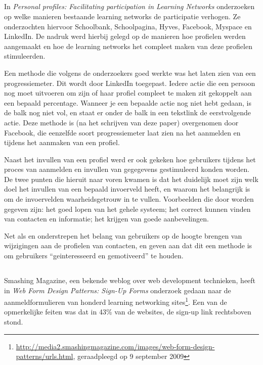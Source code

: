 \documentclass[a4paper, 10pt, pdftex]{report}
\begin{document}
    \subsection{\cite{Brouns2008}}

    In \emph{Personal profiles: Facilitating participation in Learning Networks} onderzoeken \citeauthor{Brouns2008} op welke manieren bestaande learning networks de participatie verhogen. Ze onderzochten hiervoor Schoolbank, Schoolpagina, Hyves, Facebook, Myspace en LinkedIn. De nadruk werd hierbij gelegd op de manieren hoe profielen werden aangemaakt en hoe de learning networks het compleet maken van deze profielen stimuleerden.

    Een methode die volgens de onderzoekers goed werkte was het laten zien van een progressiemeter. Dit wordt door LinkedIn toegepast. Iedere actie die een persoon nog moet uitvoeren om zijn of haar profiel compleet te maken zit gekoppelt aan een bepaald percentage. Wanneer je een bepaalde actie nog niet hebt gedaan, is de balk nog niet vol, en staat er onder de balk in een tekstlink de eerstvolgende actie. Deze methode is (na het schrijven van deze paper) overgenomen door Facebook, die eenzelfde soort progressiemeter laat zien na het aanmelden en tijdens het aanmaken van een profiel.

    Naast het invullen van een profiel werd er ook gekeken hoe gebruikers tijdens het proces van aanmelden en invullen van gegegevens gestimuleerd konden worden. De twee punten die hieruit naar voren kwamen is dat het duidelijk moet zijn welk doel het invullen van een bepaald invoerveld heeft, en waarom het belangrijk is om de invoervelden waarheidsgetrouw in te vullen. Voorbeelden die door \citeauthor{Brouns2008} worden gegeven zijn: het goed lopen van het gehele systeem; het correct kunnen vinden van contacten en informatie; het krijgen van goede aanbevelingen.

    Net als \citet{Berlanga2007} en \citet{Sohn2005} onderstrepen \citeauthor{Brouns2008} het belang van gebruikers op de hoogte brengen van wijzigingen aan de profielen van contacten, en geven aan dat dit een methode is om gebruikers ``geinteresseerd en gemotiveerd'' te houden.

    \subsection{\cite{Editorial2008}}

    Smashing Magazine, een bekende weblog over web development technieken, heeft in \emph{Web Form Design Patterns: Sign-Up Forms} onderzoek gedaan naar de aanmeldformulieren van honderd learning networking sites\footnote{\url{http://media2.smashingmagazine.com/images/web-form-design-patterns/urls.html}, geraadpleegd op 9 september 2009}. Een van de opmerkelijke feiten was dat in 43\% van de websites, de sign-up link rechtsboven stond.
\end{document}
